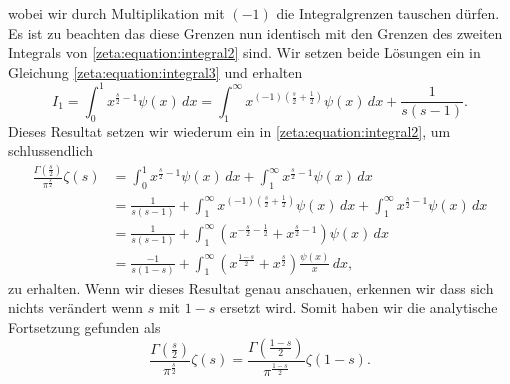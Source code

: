 wobei wir durch Multiplikation mit $(-1)$ die Integralgrenzen tauschen dürfen.
Es ist zu beachten das diese Grenzen nun identisch mit den Grenzen des zweiten Integrals von \eqref{zeta:equation:integral2} sind.
Wir setzen beide Lösungen ein in Gleichung \eqref{zeta:equation:integral3} und erhalten
\begin{equation}
    I_1
    =
    \int_0^{1}
    x^{\frac{s}{2}-1}
    \psi(x)
    \,dx
    =
    \int_{1}^{\infty}
    x^{(-1) \left(\frac{s}{2}+\frac{1}{2}\right)}
    \psi(x)
    \,dx
    +
    \frac{1}{s(s-1)}.
\end{equation}
Dieses Resultat setzen wir wiederum ein in \eqref{zeta:equation:integral2}, um schlussendlich
\begin{align}
    \frac{\Gamma \left( \frac{s}{2} \right)}{\pi^{\frac{s}{2}}}
    \zeta(s)
    &=
    \int_0^{1}
    x^{\frac{s}{2}-1}
    \psi(x)
    \,dx
    +
    \int_1^{\infty}
    x^{\frac{s}{2}-1}
    \psi(x)
    \,dx
    \nonumber
    \\
    &=
    \frac{1}{s(s-1)}
    +
    \int_{1}^{\infty}
    x^{(-1) \left(\frac{s}{2}+\frac{1}{2}\right)}
    \psi(x)
    \,dx
    +
    \int_1^{\infty}
    x^{\frac{s}{2}-1}
    \psi(x)
    \,dx
    \\
    &=
    \frac{1}{s(s-1)}
    +
    \int_{1}^{\infty}
    \left(
    x^{-\frac{s}{2}-\frac{1}{2}}
    +
    x^{\frac{s}{2}-1}
    \right)
    \psi(x)
    \,dx
    \\
    &=
    \frac{-1}{s(1-s)}
    +
    \int_{1}^{\infty}
    \left(
    x^{\frac{1-s}{2}}
    +
    x^{\frac{s}{2}}
    \right)
    \frac{\psi(x)}{x}
    \,dx,
\end{align}
zu erhalten.
Wenn wir dieses Resultat genau anschauen, erkennen wir dass sich nichts verändert wenn $s$ mit $1-s$ ersetzt wird.
Somit haben wir die analytische Fortsetzung gefunden als
\begin{equation}\label{zeta:equation:functional}
    \frac{\Gamma \left( \frac{s}{2} \right)}{\pi^{\frac{s}{2}}}
    \zeta(s)
    =
    \frac{\Gamma \left( \frac{1-s}{2} \right)}{\pi^{\frac{1-s}{2}}}
    \zeta(1-s).
\end{equation}
